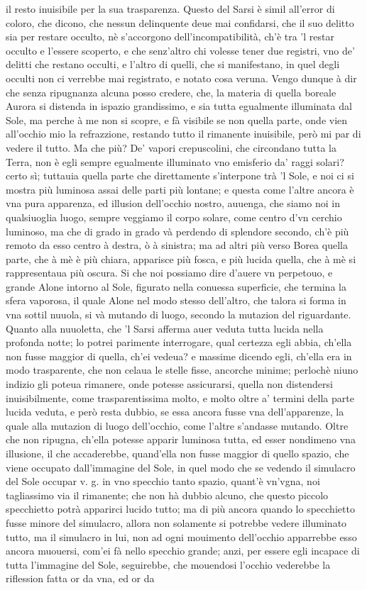 \documentclass[11pt,twoside,openany]{book}
\begin{document}
il resto inuisibile per la sua trasparenza. Questo del Sarsi è simil all'error di coloro, che dicono, che nessun delinquente deue mai confidarsi, che il suo delitto sia per restare occulto, nè s'accorgono dell'incompatibilità, ch'è tra 'l restar occulto e l'essere scoperto, e che senz'altro chi volesse tener due registri, vno de' delitti che restano occulti, e l'altro di quelli, che si manifestano, in quel degli occulti non ci verrebbe mai registrato, e notato cosa veruna. Vengo dunque à dir che senza ripugnanza alcuna posso credere, che, la materia di quella boreale Aurora si distenda in ispazio grandissimo, e sia tutta egualmente illuminata dal Sole, ma perche à me non si scopre, e fà visibile se non quella parte, onde vien all'occhio mio la refrazzione, restando tutto il rimanente inuisibile, però mi par di vedere il tutto. Ma che più? De' vapori crepuscolini, che circondano tutta la Terra, non è egli sempre egualmente illuminato vno emisferio da' raggi solari? certo sì; tuttauia quella parte che direttamente s'interpone trà 'l Sole, e noi ci si mostra più luminosa assai delle parti più lontane; e questa come l'altre ancora è vna pura apparenza, ed illusion dell'occhio nostro, auuenga, che siamo noi in qualsiuoglia luogo, sempre veggiamo il corpo solare, come centro d'vn cerchio luminoso, ma che di grado in grado và perdendo di splendore secondo, ch'è più remoto da esso centro à destra, ò à sinistra; ma ad altri più verso Borea quella parte, che à mè è più chiara, apparisce più fosca, e più lucida quella, che à mè si rappresentaua più oscura. Si che noi possiamo dire d'auere vn perpetouo, e grande Alone intorno al Sole, figurato nella conuessa superficie, che termina la sfera vaporosa, il quale Alone nel modo stesso dell'altro, che talora si forma in vna sottil nuuola, si và mutando di luogo, secondo la mutazion del riguardante. Quanto alla nuuoletta, che 'l Sarsi afferma auer veduta tutta lucida nella profonda notte; lo potrei parimente interrogare, qual certezza egli abbia, ch'ella non fusse maggior di quella, ch'ei vedeua? e massime dicendo egli, ch'ella era in modo trasparente, che non celaua le stelle fisse, ancorche minime; perlochè niuno indizio gli poteua rimanere, onde potesse assicurarsi, quella non distendersi inuisibilmente, come trasparentissima molto, e molto oltre a' termini della parte lucida veduta, e però resta dubbio, se essa ancora fusse vna dell'apparenze, la quale alla mutazion di luogo dell'occhio, come l'altre s'andasse mutando. Oltre che non ripugna, ch'ella potesse apparir luminosa tutta, ed esser nondimeno vna illusione, il che accaderebbe, quand'ella non fusse maggior di quello spazio, che viene occupato dall'immagine del Sole, in quel modo che se vedendo il simulacro del Sole occupar v. g. in vno specchio tanto spazio, quant'è vn'vgna, noi tagliassimo via il rimanente; che non hà dubbio alcuno, che questo piccolo specchietto potrà apparirci lucido tutto; ma di più ancora quando lo specchietto fusse minore del simulacro, allora non solamente si potrebbe vedere illuminato tutto, ma il simulacro in lui, non ad ogni mouimento dell'occhio apparrebbe esso ancora muouersi, com'ei fà nello specchio grande; anzi, per essere egli incapace di tutta l'immagine del Sole, seguirebbe, che mouendosi l'occhio vederebbe la riflession fatta or da vna, ed or da 
\end{document}
